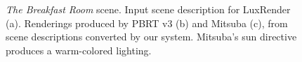 \begin{figure}
\centering
{}	
\caption{\textit{The Breakfast Room} scene. Input scene description for LuxRender (a).
	Renderings produced by PBRT v3 (b) and Mitsuba (c),
	from scene descriptions converted by our system. Mitsuba's sun directive produces a warm-colored lighting.}
\label{fig:dining-room}
\end{figure}


